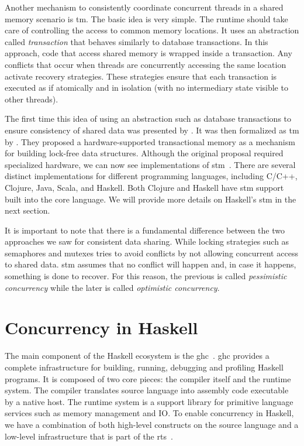 Another mechanism to consistently coordinate concurrent threads in a shared memory scenario is \ac{tm}. The basic idea is very simple. The runtime should take care of controlling the access to common memory locations. It uses an abstraction called \emph{transaction} that behaves similarly to database transactions. In this approach, code that access shared memory is wrapped inside a transaction. Any conflicts that occur when threads are concurrently accessing the same location activate recovery strategies. These strategies ensure that each transaction is executed as if atomically and in isolation (with no intermediary state visible to other threads).

The first time this idea of using an abstraction such as database transactions to ensure consistency of shared data was presented by \cite{lomet:1977}. It was then formalized as \acl{tm} by \cite{herlihy:1993}. They proposed a hardware-supported transactional memory as a mechanism for building lock-free data structures. Although the original proposal required specialized hardware, we can now see implementations of \ac{stm}~\citep{shavit:1995}. There are several distinct implementations for different programming languages, including C/C++, Clojure, Java, Scala, and Haskell. Both Clojure and Haskell have  \acs{stm} support built into the core language. We will provide more details on Haskell's \acs{stm} in the next section.

It is important to note that there is a fundamental difference between the two approaches we saw for consistent data sharing. While locking strategies such as semaphores and mutexes tries to avoid conflicts by not allowing concurrent access to shared data. \acs{stm} assumes that no conflict will happen and, in case it happens, something is done to recover. For this reason, the previous is called \emph{pessimistic concurrency} while the later is called \emph{optimistic concurrency}.


\section{Concurrency in Haskell}\label{sec:haskell-conc}
The main component of the Haskell ecosystem is the \ac{ghc}~\citep{smpj:1993}. \acs{ghc} provides a complete infrastructure for building, running, debugging and profiling Haskell programs. It is composed of two core pieces: the compiler itself and the runtime system. The compiler translates source language into assembly code executable by a native host. The runtime system is a support library for primitive language services such as memory management and IO. To enable concurrency in Haskell, we have a combination of both high-level constructs on the source language and a low-level infrastructure that is part of the \ac{rts}~\citep{li:2007}.

